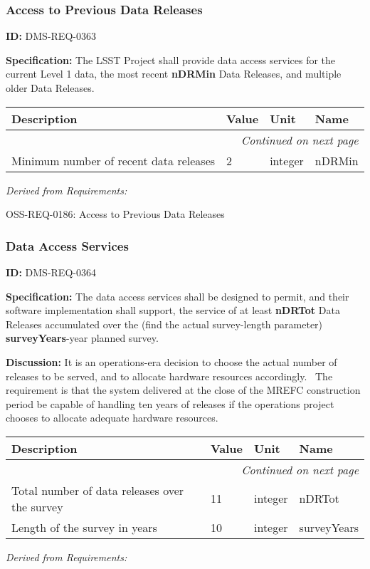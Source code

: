 \documentclass[SE,toc,lsstdraft]{lsstdoc}
\makeatletter
\newcommand{\paramname}[1]{\hspace{0pt}#1}
\newcommand{\unitname}[1]{\hspace{0pt}#1}
\newenvironment{parameters}[0]{%
\setlength\LTleft{0pt}
\setlength\LTright{\fill}
\begin{small}
\begin{longtable}[]{|p{0.49\textwidth}|l|p{0.6in}|p{1.70in}@{}|}

\hline \textbf{Description} & \textbf{Value} & \textbf{Unit} & \textbf{Name} \\ \hline
\endhead

\hline \multicolumn{4}{r}{\emph{Continued on next page}} \\
\endfoot

\hline\hline
\endlastfoot
}{%
\hline
\end{longtable}
\end{small}
}
\makeatother
\begin{document}
\subsubsection{Access to Previous Data Releases}

\label{DMS-REQ-0363}
\textbf{ID:} DMS-REQ-0363

\textbf{Specification:}
The LSST Project shall provide data access services for the current Level 1 data, the most recent \textbf{nDRMin} Data Releases, and multiple older Data Releases.

\begin{parameters}
Minimum number of recent data releases
&
2
&
\unitname{%
integer
}
&
\paramname{%
nDRMin
} \\\hline
\end{parameters}

\emph{Derived from Requirements:}

OSS-REQ-0186:
Access to Previous Data Releases \newline

\subsubsection{Data Access Services}

\label{DMS-REQ-0364}
\textbf{ID:} DMS-REQ-0364

\textbf{Specification:}
The data access services shall be designed to permit, and their software implementation shall support, the service of at least \textbf{nDRTot} Data Releases accumulated over the (find the actual survey-length parameter) \textbf{surveyYears}-year planned survey.

\textbf{Discussion:}
It is an operations-era decision to choose the actual number of releases to be served, and to allocate hardware resources accordingly.  The requirement is that the system delivered at the close of the MREFC construction period be capable of handling ten years of releases if the operations project chooses to allocate adequate hardware resources.

\begin{parameters}
Total number of data releases over the survey
&
11
&
\unitname{%
integer
}
&
\paramname{%
nDRTot
} \\\hline
Length of the survey in years
&
10
&
\unitname{%
integer
}
&
\paramname{%
surveyYears
} \\\hline
\end{parameters}

\emph{Derived from Requirements:}
\end{document}
